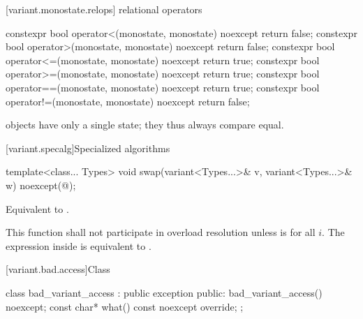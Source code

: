[variant.monostate.relops]{ relational operators}

%
%
%
%
%
%
\begin{itemdecl}
constexpr bool operator<(monostate, monostate) noexcept { return false; }
constexpr bool operator>(monostate, monostate) noexcept { return false; }
constexpr bool operator<=(monostate, monostate) noexcept { return true; }
constexpr bool operator>=(monostate, monostate) noexcept { return true; }
constexpr bool operator==(monostate, monostate) noexcept { return true; }
constexpr bool operator!=(monostate, monostate) noexcept { return false; }
\end{itemdecl}

\begin{itemdescr}
\pnum
\begin{note}  objects have only a single state; they thus always compare equal.\end{note}
\end{itemdescr}


[variant.specalg]{Specialized algorithms}

%
\begin{itemdecl}
template<class... Types>
  void swap(variant<Types...>& v, variant<Types...>& w) noexcept(@\seebelow@);
\end{itemdecl}

\begin{itemdescr}
\pnum
\effects Equivalent to .

\pnum
\remarks This function shall not participate in overload resolution
unless 
is  for all $i$.
The expression inside  is equivalent to .
\end{itemdescr}

%
[variant.bad.access]{Class }

\begin{codeblock}
class bad_variant_access : public exception {
public:
  bad_variant_access() noexcept;
  const char* what() const noexcept override;
};
\end{codeblock}

